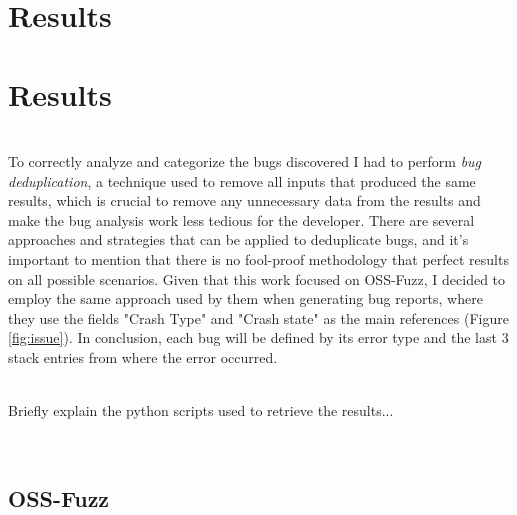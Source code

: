 \chapter{Results}
\chapter{Results}
\ \\
To correctly analyze and categorize the bugs discovered I had to perform \textit{bug deduplication}, a technique used to remove all inputs that produced the same results, which is crucial to remove any unnecessary data from the results and make the bug analysis work less tedious for the developer.
\newline \newline
There are several approaches and strategies that can be applied to deduplicate bugs, and it's important to mention that there is no fool-proof methodology that perfect results on all possible scenarios.
\newline
Given that this work focused on OSS-Fuzz, I decided to employ the same approach used by them when generating bug reports, where they use the fields "Crash Type" and "Crash state" as the main references (Figure \ref{fig:issue}).
\newline
In conclusion, each bug will be defined by its error type and the last 3 stack entries from where the error occurred.
 
\ \\ \newline \newline
Briefly explain the python scripts used to retrieve the results...



\ \\

\section{OSS-Fuzz}




